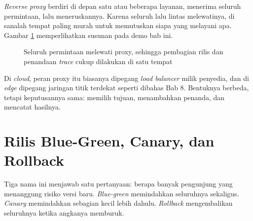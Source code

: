 \textit{Reverse proxy} berdiri di depan satu atau beberapa layanan, menerima
seluruh permintaan, lalu meneruskannya. Karena seluruh lalu lintas
melewatinya, di sanalah tempat paling murah untuk memutuskan siapa yang
melayani apa. Gambar \ref{fig:topologi9} memperlihatkan susunan pada demo
bab ini.

\begin{figure}[!htb]
  \centering
  \caption{Seluruh permintaan melewati proxy, sehingga pembagian rilis dan
           penandaan \textit{trace} cukup dilakukan di satu tempat}
  \label{fig:topologi9}
\end{figure}

Di \textit{cloud}, peran proxy itu biasanya dipegang \textit{load balancer}
milik penyedia, dan di \textit{edge} dipegang jaringan titik terdekat seperti
dibahas Bab 8. Bentuknya berbeda, tetapi keputusannya sama: memilih tujuan,
menambahkan penanda, dan mencatat hasilnya.

\section{Rilis Blue-Green, Canary, dan Rollback}

Tiga nama ini menjawab satu pertanyaan: berapa banyak pengunjung yang
menanggung risiko versi baru. \textit{Blue-green} memindahkan seluruhnya
sekaligus. \textit{Canary} memindahkan sebagian kecil lebih dahulu.
\textit{Rollback} mengembalikan seluruhnya ketika angkanya memburuk.

